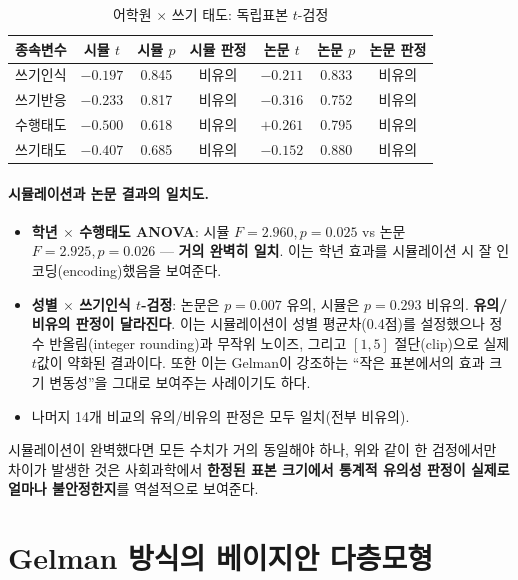 \documentclass[11pt]{article}
\begin{document}
\begin{table}[h]
\centering
\caption{어학원 $\times$ 쓰기 태도: 독립표본 $t$-검정}\label{tab:freq_inst}
\begin{tabular}{lcccccc}
\toprule
종속변수 & 시뮬 $t$ & 시뮬 $p$ & 시뮬 판정 & 논문 $t$ & 논문 $p$ & 논문 판정 \\
\midrule
쓰기인식 & $-0.197$ & 0.845 & 비유의 & $-0.211$ & 0.833 & 비유의 \\
쓰기반응 & $-0.233$ & 0.817 & 비유의 & $-0.316$ & 0.752 & 비유의 \\
수행태도 & $-0.500$ & 0.618 & 비유의 & $+0.261$ & 0.795 & 비유의 \\
쓰기태도 & $-0.407$ & 0.685 & 비유의 & $-0.152$ & 0.880 & 비유의 \\
\bottomrule
\end{tabular}
\end{table}

\paragraph{시뮬레이션과 논문 결과의 일치도.}
\begin{itemize}
\item \textbf{학년 $\times$ 수행태도 ANOVA}: 시뮬 $F=2.960, p=0.025$ vs 논문 $F=2.925, p=0.026$ — \textbf{거의 완벽히 일치}. 이는 학년 효과를 시뮬레이션 시 잘 인코딩(encoding)했음을 보여준다.
\item \textbf{성별 $\times$ 쓰기인식 $t$-검정}: 논문은 $p=0.007$ 유의, 시뮬은 $p=0.293$ 비유의. \textbf{유의/비유의 판정이 달라진다}. 이는 시뮬레이션이 성별 평균차(0.4점)를 설정했으나 정수 반올림(integer rounding)과 무작위 노이즈, 그리고 $[1,5]$ 절단(clip)으로 실제 $t$값이 약화된 결과이다. 또한 이는 Gelman이 강조하는 ``작은 표본에서의 효과 크기 변동성''을 그대로 보여주는 사례이기도 하다.
\item 나머지 14개 비교의 유의/비유의 판정은 모두 일치(전부 비유의).
\end{itemize}
시뮬레이션이 완벽했다면 모든 수치가 거의 동일해야 하나, 위와 같이 한 검정에서만 차이가 발생한 것은 사회과학에서 \textbf{한정된 표본 크기에서 통계적 유의성 판정이 실제로 얼마나 불안정한지}를 역설적으로 보여준다.

\section{Gelman 방식의 베이지안 다층모형}
\label{sec:bayes}
\end{document}
